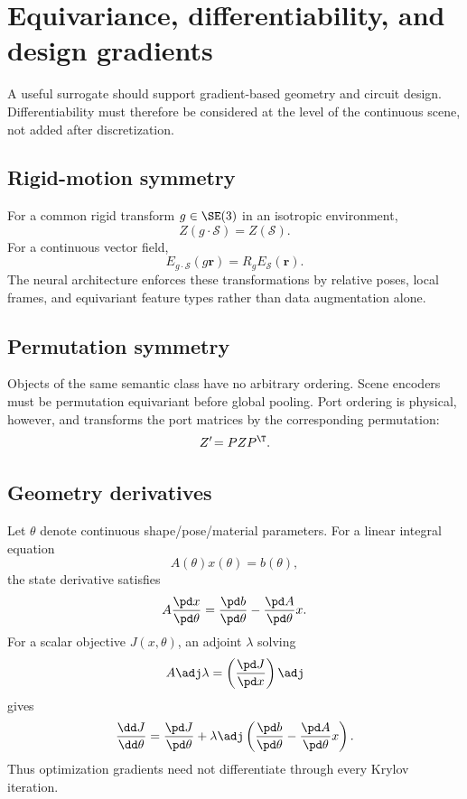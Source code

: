 \section{Equivariance, differentiability, and design gradients}
\label{sec:differentiability}

A useful surrogate should support gradient-based geometry and circuit design.
Differentiability must therefore be considered at the level of the continuous
scene, not added after discretization.

\subsection{Rigid-motion symmetry}

For a common rigid transform $g\in\SE(3)$ in an isotropic environment,
\[
 Z(g\cdot\mathcal S)=Z(\mathcal S).
\]
For a continuous vector field,
\[
 E_{g\cdot\mathcal S}(g\mathbf r)
 =
 R_gE_{\mathcal S}(\mathbf r).
\]
The neural architecture enforces these transformations by relative poses,
local frames, and equivariant feature types rather than data augmentation
alone.

\subsection{Permutation symmetry}

Objects of the same semantic class have no arbitrary ordering. Scene encoders
must be permutation equivariant before global pooling. Port ordering is
physical, however, and transforms the port matrices by the corresponding
permutation:
\[
 Z'\!=P ZP^\T.
\]

\subsection{Geometry derivatives}

Let $\theta$ denote continuous shape/pose/material parameters. For a linear
integral equation
\[
 A(\theta)x(\theta)=b(\theta),
\]
the state derivative satisfies
\[
 A\frac{\pd x}{\pd\theta}
 =
 \frac{\pd b}{\pd\theta}
 -\frac{\pd A}{\pd\theta}x.
\]
For a scalar objective $J(x,\theta)$, an adjoint $\lambda$ solving
\[
 A\adj\lambda
 =
 \left(\frac{\pd J}{\pd x}\right)\adj
\]
gives
\[
 \frac{\dd J}{\dd\theta}
 =
 \frac{\pd J}{\pd\theta}
 +\lambda\adj
 \left(
  \frac{\pd b}{\pd\theta}
  -\frac{\pd A}{\pd\theta}x
 \right).
\]
Thus optimization gradients need not differentiate through every Krylov
iteration.

